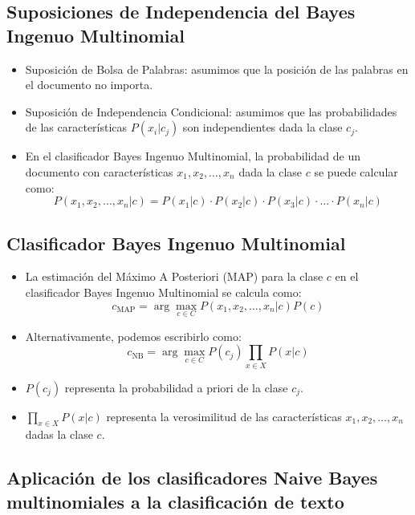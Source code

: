\subsection{Suposiciones de Independencia del Bayes Ingenuo Multinomial}
\begin{itemize}
    \item Suposición de Bolsa de Palabras: asumimos que la posición de las palabras en el documento no importa.
    \item Suposición de Independencia Condicional: asumimos que las probabilidades de las características $P(x_i | c_j)$ son independientes dada la clase $c_j$.
    \item En el clasificador Bayes Ingenuo Multinomial, la probabilidad de un documento con características $x_1, x_2, \ldots, x_n$ dada la clase $c$ se puede calcular como:
    \[
    P(x_1, x_2, \ldots, x_n | c) = P(x_1 | c) \cdot P(x_2 | c) \cdot P(x_3 | c) \cdot \ldots \cdot P(x_n | c)
    \]
\end{itemize}

\subsection{Clasificador Bayes Ingenuo Multinomial}
\begin{itemize}
    \item La estimación del Máximo A Posteriori (MAP) para la clase $c$ en el clasificador Bayes Ingenuo Multinomial se calcula como:
    \[
    c_{\text{MAP}} = \arg\max_{c \in C} P(x_1, x_2, \ldots, x_n | c)P(c)
    \]
    \item Alternativamente, podemos escribirlo como:
    \[
    c_{\text{NB}} = \arg\max_{c \in C} P(c_j) \prod_{x \in X} P(x | c)
    \]
    \item $P(c_j)$ representa la probabilidad a priori de la clase $c_j$.
    \item $\prod_{x \in X} P(x | c)$ representa la verosimilitud de las características $x_1, x_2, \ldots, x_n$ dadas la clase $c$.
\end{itemize}


\subsection{Aplicación de los clasificadores Naive Bayes multinomiales a la clasificación de texto}

